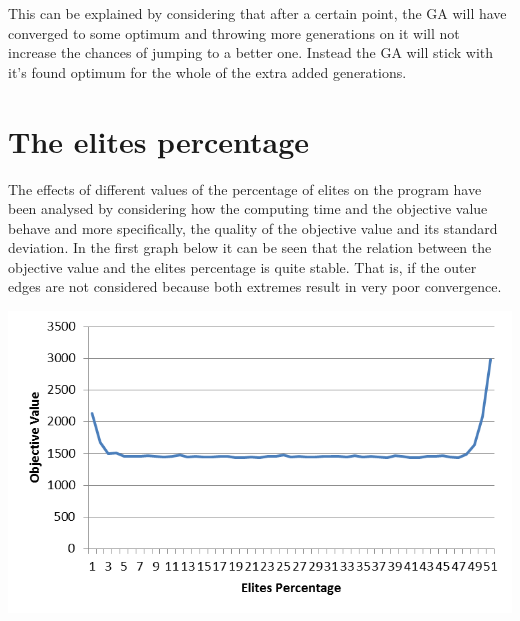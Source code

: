 \par
This can be explained by considering that after a certain point, the GA will have converged to some optimum and throwing more generations on it will not increase the chances of jumping to a better one. Instead the GA will stick with it’s found optimum for the whole of the extra added generations.


\section{The elites percentage}

\par
The effects of different values of the percentage of elites on the program have been analysed by considering how the computing time and the objective value behave and more specifically, the quality of the objective value and its standard deviation.
In the first graph below it can be seen that the relation between the objective value and the elites percentage is quite stable. That is, if the outer edges are not considered because both extremes result in very poor convergence.

	\includegraphics[height=8cm]{OVEP}


